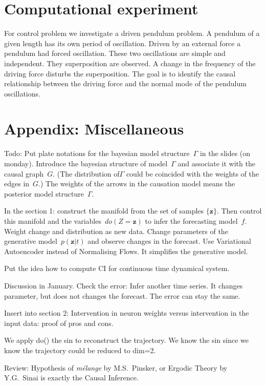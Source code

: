 \documentclass[12pt]{article}
\begin{document}
\section{Computational experiment}
For control problem we investigate a driven pendulum problem.
A pendulum of a given length has its own period of oscillation.
Driven by an external force a pendulum had forced oscillation.
These two oscillations are simple and independent.
They superposition are observed.
A change in the frequency of the driving force disturbs the superposition.
The goal is to identify the causal relationship between the driving force and the normal mode of the pendulum oscillations.

\newpage
\section{Appendix: Miscellaneous}

Todo: Put plate notations for the bayesian model structure~$\Gamma$ in the slides (on monday).
Introduce the bayesian structure of model~$\Gamma$ and associate it with the causal graph~$G$.
(The distribution of$\Gamma$ could be coincided with the weights of the edges in~$G$.)
The weights of the arrows in the causation model means the posterior model structure~$\Gamma$.

In the section 1: construct the manifold from the set of samples $\{\mathbf{z}\}$.
Then control this manifold and the variables~$do(Z=\mathbf{z})$ to infer the forecasting model~$f$.
Weight change and distribution as new data.
Change parameters of the generative model~$p(\mathbf{z}|t)$ and observe changes in the forecast.
Use Variational Autoencoder instead of Normalising Flows.
It simplifies the generative model.

Put the idea how to compute CI for continuous time dynamical system.


Discussion in January.
Check the error:
Infer another time series.
It changes parameter, but does not changes the forecast.
The error can stay the same.


Insert into section 2: Intervention in neuron weights versus intervention in the input data: proof of pros and cons.

We apply do()  the sin to reconstruct the trajectory. We know the sin since we know the trajectory could be reduced to dim=2.

Review: Hypothesis of \emph{mélange} by M.S.~Pinsker, or Ergodic Theory by Y.G.~Sinai is exactly the Causal Inference.
\end{document}
